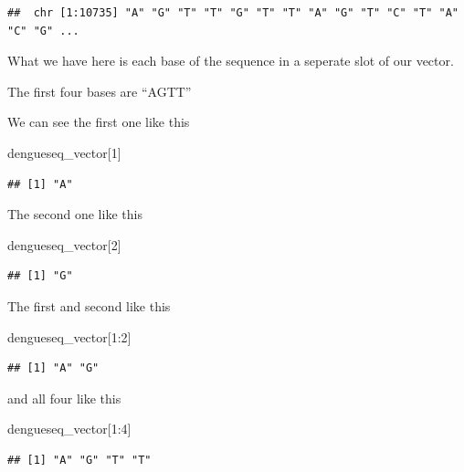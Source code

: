 \documentclass[
]{book}
\newenvironment{Shaded}{\begin{snugshade}}{\end{snugshade}}
\newcommand{\DecValTok}[1]{\textcolor[rgb]{0.00,0.00,0.81}{#1}}
\newcommand{\NormalTok}[1]{#1}
\newcommand{\SpecialCharTok}[1]{\textcolor[rgb]{0.00,0.00,0.00}{#1}}
\begin{document}
\begin{verbatim}
##  chr [1:10735] "A" "G" "T" "T" "G" "T" "T" "A" "G" "T" "C" "T" "A" "C" "G" ...
\end{verbatim}

What we have here is each base of the sequence in a seperate slot of our vector.

The first four bases are ``AGTT''

We can see the first one like this

\begin{Shaded}
\begin{Highlighting}[]
\NormalTok{dengueseq\_vector[}\DecValTok{1}\NormalTok{]}
\end{Highlighting}
\end{Shaded}

\begin{verbatim}
## [1] "A"
\end{verbatim}

The second one like this

\begin{Shaded}
\begin{Highlighting}[]
\NormalTok{dengueseq\_vector[}\DecValTok{2}\NormalTok{]}
\end{Highlighting}
\end{Shaded}

\begin{verbatim}
## [1] "G"
\end{verbatim}

The first and second like this

\begin{Shaded}
\begin{Highlighting}[]
\NormalTok{dengueseq\_vector[}\DecValTok{1}\SpecialCharTok{:}\DecValTok{2}\NormalTok{]}
\end{Highlighting}
\end{Shaded}

\begin{verbatim}
## [1] "A" "G"
\end{verbatim}

and all four like this

\begin{Shaded}
\begin{Highlighting}[]
\NormalTok{dengueseq\_vector[}\DecValTok{1}\SpecialCharTok{:}\DecValTok{4}\NormalTok{]}
\end{Highlighting}
\end{Shaded}

\begin{verbatim}
## [1] "A" "G" "T" "T"
\end{verbatim}
\end{document}
